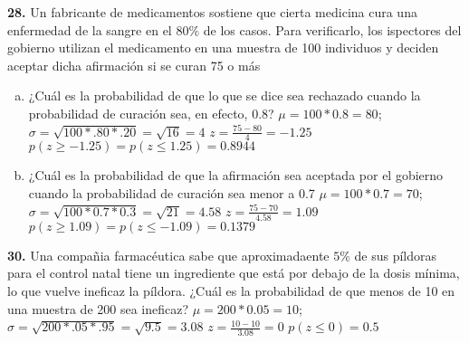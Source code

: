 \documentclass[12pt, letterpaper]{article}
\begin{document}
    \textbf{28. }Un fabricante de medicamentos sostiene que cierta medicina cura una enfermedad de la sangre en el $80\%$
    de los casos. Para verificarlo, los ispectores del gobierno utilizan el medicamento en una muestra de 100 individuos y
    deciden aceptar dicha afirmación si se curan 75 o más
        \begin{enumerate}[a)]
            \item ¿Cuál es la probabilidad de que lo que se dice sea rechazado cuando la probabilidad de curación sea,
                  en efecto, 0.8?\vskip0.5cm
                $\mu = 100*0.8=80$; $\sigma = \sqrt{100*.80*.20}=\sqrt{16}=4$\vskip0.5cm
                $z=\displaystyle\frac{75-80}{4}=-1.25$\vskip0.5cm
                $p(z\geq -1.25)=p(z\leq 1.25)=0.8944$
            \item ¿Cuál es la probabilidad de que la afirmación sea aceptada por el gobierno cuando la probabilidad de
                  curación sea menor a 0.7\vskip0.5cm
                $\mu=100*0.7=70$; $\sigma = \sqrt{100*0.7*0.3}=\sqrt{21}=4.58$\vskip0.5cm
                $z=\displaystyle\frac{75-70}{4.58}=1.09$\vskip0.5cm
                $p(z\geq 1.09)=p(z\leq -1.09)=0.1379$
        \end{enumerate}\vskip1cm

    \textbf{30. }Una compañia farmacéutica sabe que aproximadaente $5\%$ de sus píldoras para el control natal tiene un
    ingrediente que está por debajo de la dosis mínima, lo que vuelve ineficaz la píldora. ¿Cuál es la probabilidad de que
    menos de 10 en una muestra de 200 sea ineficaz?\vskip0.5cm
        $\mu = 200*0.05=10$; $\sigma = \sqrt{200*.05*.95}=\sqrt{9.5}=3.08$\vskip0.5cm
        $z=\displaystyle\frac{10-10}{3.08}=0$\vskip0.5cm
        $p(z\leq 0)=0.5$
\end{document}
